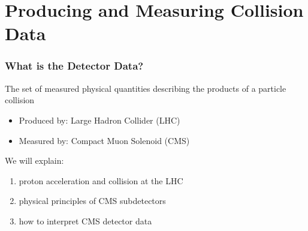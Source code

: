 \documentclass[14pt, t]{beamer}
\begin{document}
\section{Producing and Measuring Collision Data}
\begin{frame}
\frametitle{What is the Detector Data?}

The set of measured physical quantities describing the products of a particle collision

\vspace{2mm}
\begin{itemize}


    \item Produced by: Large Hadron Collider (LHC)

    \item Measured by: Compact Muon Solenoid (CMS)

\end{itemize}
\vspace{4mm}
We will explain:
\begin{enumerate}

    \item proton acceleration and collision at the LHC

    \item physical principles of CMS subdetectors

    \item how to interpret CMS detector data

\end{enumerate}
    
\end{frame}
\end{document}
